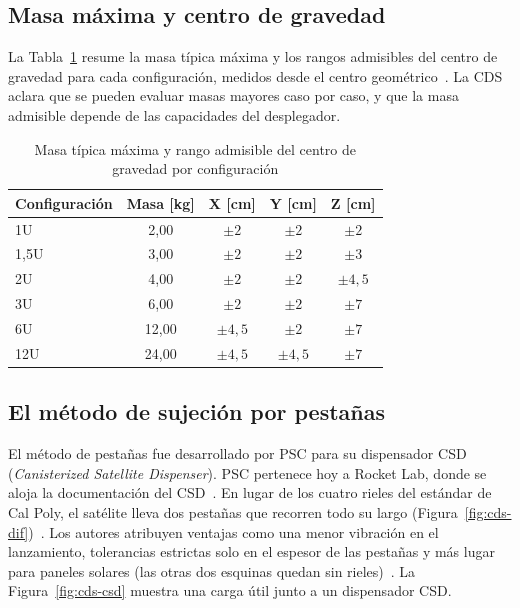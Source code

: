 \subsection{Masa máxima y centro de gravedad}\label{subsec:cds-masa}

La Tabla~\ref{tab:cds-masa-cg} resume la masa típica máxima y los rangos admisibles del centro de gravedad para cada configuración, medidos desde el centro geométrico~\cite[Sec.~2.2.10 y 2.2.11, Tablas~1 y~2]{cds14}. La CDS aclara que se pueden evaluar masas mayores caso por caso, y que la masa admisible depende de las capacidades del desplegador.

\begin{table}[H]
  \centering
  \setlength{\tabcolsep}{6pt}
  \begin{tabular}{lcccc}
    \toprule
    Configuración & Masa [\si{\kilo\gram}] & X [\si{\centi\metre}] & Y [\si{\centi\metre}] & Z [\si{\centi\metre}] \\
    \midrule
    1U   & 2,00  & $\pm 2$   & $\pm 2$   & $\pm 2$   \\
    1,5U & 3,00  & $\pm 2$   & $\pm 2$   & $\pm 3$   \\
    2U   & 4,00  & $\pm 2$   & $\pm 2$   & $\pm 4{,}5$ \\
    3U   & 6,00  & $\pm 2$   & $\pm 2$   & $\pm 7$   \\
    6U   & 12,00 & $\pm 4{,}5$ & $\pm 2$ & $\pm 7$   \\
    12U  & 24,00 & $\pm 4{,}5$ & $\pm 4{,}5$ & $\pm 7$ \\
    \bottomrule
  \end{tabular}
  \caption[Masa y centro de gravedad por configuración (CDS Rev.~14.1)]{Masa típica máxima y rango admisible del centro de gravedad por configuración}\label{tab:cds-masa-cg}
\end{table}

\subsection{El método de sujeción por pestañas}\label{subsec:pestanas}

El método de pestañas fue desarrollado por PSC para su dispensador CSD (\emph{Canisterized Satellite Dispenser}). PSC pertenece hoy a Rocket Lab, donde se aloja la documentación del CSD~\cite{rocketlabdisp}. En lugar de los cuatro rieles del estándar de Cal Poly, el satélite lleva dos pestañas que recorren todo su largo (Figura~\ref{fig:cds-dif})~\cite{hevner11}. Los autores atribuyen ventajas como una menor vibración en el lanzamiento, tolerancias estrictas solo en el espesor de las pestañas y más lugar para paneles solares (las otras dos esquinas quedan sin rieles)~\cite{hevner11}. La Figura~\ref{fig:cds-csd} muestra una carga útil junto a un dispensador CSD\@.

